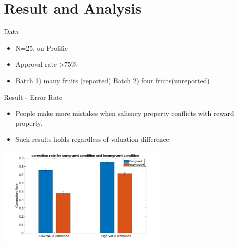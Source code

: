 \documentclass[UKenglish, aspectratio = 169]{beamer}
\begin{document}
\section{Result and Analysis}

\begin{frame}{Data}
\begin{itemize}
    \item N=25, on Prolific
    \item Approval rate >75\%
    \item Batch 1) many fruits (reported) Batch 2) four fruits(unreported)
\end{itemize}
\end{frame}


\begin{frame}{Result - Error Rate}
\begin{itemize}
    \item People make more mistakes when saliency property conflicts with reward property. 
    \item Such results holds regardless of valuation difference.
\end{itemize}
\center
\includegraphics[height = 5cm]{images/errorRateComparison.jpg}
\end{frame}
\end{document}
